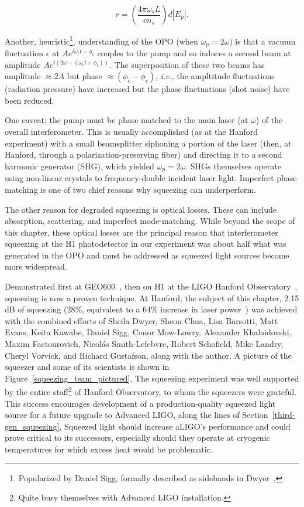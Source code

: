 \begin{equation}
r = \left(\frac{4\pi \omega_s L}{c n_s} \right) d |E_p|.
\label{how_much_squeezing}
\end{equation} 

\noindent Another, heuristic\footnote{Popularized by Daniel Sigg, formally described as sidebands in Dwyer~\cite{DwyerThesis}.}, understanding of the OPO (when $\omega_p = 2\omega)$ is that a vacuum fluctuation $\epsilon$ at $A e^{i\omega_\epsilon t + \phi_\epsilon}$ couples to the pump and so induces a second beam at amplitude $A e^{i\left(2\omega - (\omega_\epsilon t + \phi_\epsilon)\right)}$.
The superposition of these two beams has amplitude $\approx 2 A$ but phase $\approx (\phi_\epsilon - \phi_\epsilon)$, \textit{i.e.}, the ampltitude fluctuations (radiation pressure) have increased but the phase fluctuations (shot noise) have been reduced.

One caveat: the pump must be phase matched to the main laser (at $\omega$) of the overall interferometer.
This is usually accomplished (as at the Hanford experiment) with a small beamsplitter siphoning a portion of the laser (then, at Hanford, through a polarization-preserving fiber) and directing it to a second harmonic generator (SHG), which yielded $\omega_p = 2\omega$.
SHGs themselves operate using non-linear crystals to frequency-double incident laser light.
Imperfect phase matching is one of two chief reasons why squeezing can underperform.

The other reason for degraded squeezing is optical losses.
These can include absorption, scattering, and imperfect mode-matching.
While beyond the scope of this chapter, these optical losses are the principal reason that interferometer squeezing at the H1 photodetector in our experiment was about half what was generated in the OPO and must be addressed as squeezed light sources become more widespread.

Demonstrated first at GEO600~\cite{GEO600NatureSqueezing}, then on H1 at the LIGO Hanford Observatory~\cite{BarsottiNatureSqueezing}, squeezing is now a proven technique.
At Hanford, the subject of this chapter, 2.15 dB of squeezing (28\%, equivalent to a 64\% increase in laser power~\cite{BarsottiNatureSqueezing}) was achieved with the combined efforts of Sheila Dwyer, Sheon Chua, Lisa Barsotti, Matt Evans, Keita Kawabe, Daniel Sigg, Conor Mow-Lowry, Alexander Khalaidovski, Maxim Factourovich, Nicol\'{a}s Smith-Lefebvre, Robert Schofield, Mike Landry, Cheryl Vorvick, and Richard Gustafson, along with the author.
A picture of the squeezer and some of its scientists is shown in Figure~\ref{squeezing_team_pictured}.
The squeezing experiment was well supported by the entire staff\footnote{Quite busy themselves with Advanced LIGO installation.} of Hanford Observatory, to whom the squeezers were grateful.
This success encourages development of a production-quality squeezed light source for a future upgrade to Advanced LIGO, along the lines of Section~\ref{third-gen_squeezing}.
Squeezed light should increase aLIGO's performance and could prove critical to its successors, especially should they operate at cryogenic temperatures for which excess heat would be problematic.

